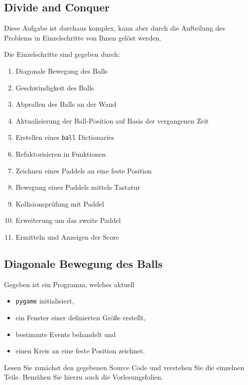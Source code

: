 \documentclass[
]{scrartcl}
\providecommand{\tightlist}{%
  \setlength{\itemsep}{0pt}\setlength{\parskip}{0pt}}
\begin{document}
\hypertarget{divide-and-conquer}{%
\subsection{Divide and Conquer}\label{divide-and-conquer}}

Diese Aufgabe ist durchaus komplex, kann aber durch die Aufteilung des
Problems in Einzelschritte von Ihnen gelöst werden.

Die Einzelschritte sind gegeben durch:

\begin{enumerate}
\def\labelenumi{\arabic{enumi}.}
\tightlist
\item
  Diagonale Bewegung des Balls
\item
  Geschwindigkeit des Balls
\item
  Abprallen des Balls an der Wand
\item
  Aktualisierung der Ball-Position auf Basis der vergangenen Zeit
\item
  Erstellen eines \texttt{ball} Dictionaries
\item
  Refaktorisieren in Funktionen
\item
  Zeichnen eines Paddels an eine feste Position
\item
  Bewegung eines Paddels mittels Tastatur
\item
  Kollisionsprüfung mit Paddel
\item
  Erweiterung um das zweite Paddel
\item
  Ermitteln und Anzeigen der Score
\end{enumerate}

\hypertarget{diagonale-bewegung-des-balls}{%
\subsection{Diagonale Bewegung des
Balls}\label{diagonale-bewegung-des-balls}}

Gegeben ist ein Programm, welches aktuell

\begin{itemize}
\tightlist
\item
  \texttt{pygame} initialisiert,
\item
  ein Fenster einer definierten Größe erstellt,
\item
  bestimmte Events behandelt und
\item
  einen Kreis an eine feste Position zeichnet.
\end{itemize}

 Lesen Sie zunächst den gegebenen Source Code und verstehen
Sie die einzelnen Teile. Bemühen Sie hierzu auch die Vorlesungsfolien.
\end{document}
